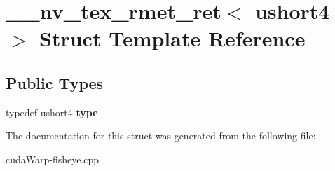\hypertarget{struct____nv__tex__rmet__ret_3_01ushort4_01_4}{}\section{\+\_\+\+\_\+nv\+\_\+tex\+\_\+rmet\+\_\+ret$<$ ushort4 $>$ Struct Template Reference}
\label{struct____nv__tex__rmet__ret_3_01ushort4_01_4}
\subsection*{Public Types}
\begin{DoxyCompactItemize}
\item 
typedef ushort4 {\bfseries type}\hypertarget{struct____nv__tex__rmet__ret_3_01ushort4_01_4_ac3bb277f0a9d5da8b0d80dfcd8e50121}{}\label{struct____nv__tex__rmet__ret_3_01ushort4_01_4_ac3bb277f0a9d5da8b0d80dfcd8e50121}

\end{DoxyCompactItemize}


The documentation for this struct was generated from the following file\+:\begin{DoxyCompactItemize}
\item 
cuda\+Warp-\/fisheye.\+cpp\end{DoxyCompactItemize}
